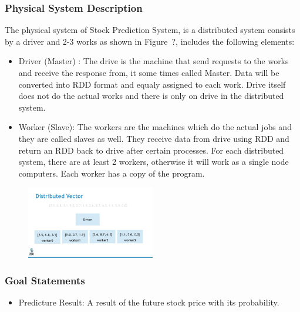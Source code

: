 \documentclass[12pt]{article}
\newcounter{goalnum} %
\newcommand{\progname}{Stock Prediction System} %
\begin{document}
\subsubsection{Physical System Description}

The physical system of \progname{}, is a distributed system consists by a driver and 2-3 works as shown in Figure~?,
includes the following elements:

\begin{itemize}

\item Driver (Master) : 
The drive is the machine that send requests to the works and receive the response from, it some times called Master. Data will be converted into RDD format and equaly assigned to each work. Drive itself does not do the actual works and there is only on drive in the distributed system.

\item Worker (Slave): 
The workers are the machines which do the actual jobs and they are called slaves as well. They receive data from drive using RDD and return an RDD back to drive after certain processes.  For each distributed system, there are at least 2 workers, otherwise it will work as a single node computers. Each worker has a copy of the program.  


\end{itemize}


\begin{figure}[h!]
\begin{center}
{
  \includegraphics[width=0.5\textwidth]{sparkrdd.png}
 }
 \caption{\label{Spark}}
 \end{center}
 \end{figure}

\subsubsection{Goal Statements}

\begin{itemize}

\item Predicture Result\thegoalnum \label{G_meaningfulLabel}: A result of the future stock price with its probability.

\end{itemize}
\end{document}
